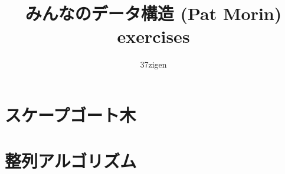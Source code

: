 \documentclass[dvipdfmx]{jarticle}
\title{みんなのデータ構造 (Pat Morin) exercises}
\author{37zigen}
\begin{document}
\maketitle


\section{スケープゴート木}


\section{整列アルゴリズム}


\newpage
\end{document}
